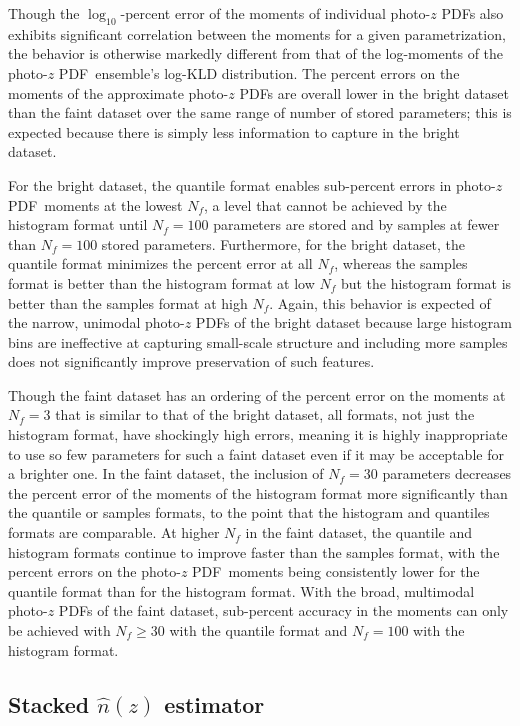 \documentclass[\docopts]{\docclass}
\newcommand{\pz}{photo-$z$ PDF}
\newcommand{\mgdata}{bright\xspace}
\newcommand{\ssdata}{faint\xspace}
\begin{document}
Though the $\log_{10}$-percent error of the moments of individual \pz s also 
exhibits significant correlation between the moments for a given 
parametrization, the behavior is otherwise markedly different from that of the 
log-moments of the \pz\ ensemble's log-KLD distribution.
The percent errors on the moments of the approximate \pz s are overall lower in 
the \mgdata dataset than the \ssdata dataset over the same range of number of 
stored parameters; this is expected because there is simply less information to 
capture in the \mgdata dataset.

For the \mgdata dataset, the quantile format enables sub-percent errors in \pz\ 
moments at the lowest $N_{f}$, a level that cannot be achieved by the histogram 
format until $N_{f}=100$ parameters are stored and by samples at fewer than 
$N_{f}=100$ stored parameters.
Furthermore, for the \mgdata dataset, the quantile format minimizes the percent 
error at all $N_{f}$, whereas the samples format is better than the histogram 
format at low $N_{f}$ but the histogram format is better than the samples 
format at high $N_{f}$.
Again, this behavior is expected of the narrow, unimodal \pz s of the \mgdata 
dataset because large histogram bins are ineffective at capturing small-scale 
structure and including more samples does not significantly improve 
preservation of such features.

Though the \ssdata dataset has an ordering of the percent error on the moments 
at $N_{f}=3$ that is similar to that of the \mgdata dataset, all formats, not 
just the histogram format, have shockingly high errors, meaning it is highly 
inappropriate to use so few parameters for such a faint dataset even if it may 
be acceptable for a brighter one.
In the \ssdata dataset, the inclusion of $N_{f}=30$ parameters decreases the 
percent error of the moments of the histogram format more significantly than 
the quantile or samples formats, to the point that the histogram and quantiles 
formats are comparable.
At higher $N_{f}$ in the \ssdata dataset, the quantile and histogram formats 
continue to improve faster than the samples format, with the percent errors on 
the \pz\ moments being consistently lower for the quantile format than for the 
histogram format.
With the broad, multimodal \pz s of the \ssdata dataset, sub-percent accuracy 
in the moments can only be achieved with $N_{f}\geq30$ with the quantile format 
and $N_{f}=100$ with the histogram format.

\subsection{Stacked $\hat{n}(z)$ estimator}
\label{sec:stacked_results}
\end{document}
